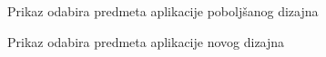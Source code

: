 \documentclass[times, utf8, zavrsni, numeric]{fer}
\begin{document}
    \begin{figure} [H]
      \centering
      \caption{Prikaz odabira predmeta aplikacije poboljšanog dizajna}
    \end{figure}
    
    \begin{figure} [H]
      \centering
      \caption{Prikaz odabira predmeta aplikacije novog dizajna}
    \end{figure}
    
\end{document}
